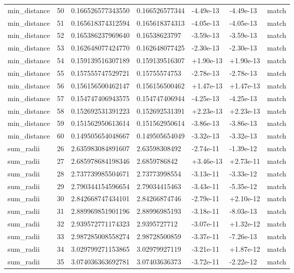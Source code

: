 \begin{longtable}{lllllll}
min\_distance & 50 & 0.166526577343550 & 0.166526577344 & -4.49e-13 & -4.49e-13 & match \\
min\_distance & 51 & 0.165618374312594 & 0.165618374313 & -4.05e-13 & -4.05e-13 & match \\
min\_distance & 52 & 0.165386237969640 & 0.16538623797 & -3.59e-13 & -3.59e-13 & match \\
min\_distance & 53 & 0.162648077424770 & 0.162648077425 & -2.30e-13 & -2.30e-13 & match \\
min\_distance & 54 & 0.159139516307189 & 0.159139516307 & +1.90e-13 & +1.90e-13 & match \\
min\_distance & 55 & 0.157555747529721 & 0.15755574753 & -2.78e-13 & -2.78e-13 & match \\
min\_distance & 56 & 0.156156500462147 & 0.156156500462 & +1.47e-13 & +1.47e-13 & match \\
min\_distance & 57 & 0.154747406943575 & 0.154747406944 & -4.25e-13 & -4.25e-13 & match \\
min\_distance & 58 & 0.152692531391223 & 0.152692531391 & +2.23e-13 & +2.23e-13 & match \\
min\_distance & 59 & 0.151562950613614 & 0.151562950614 & -3.86e-13 & -3.86e-13 & match \\
min\_distance & 60 & 0.149505654048667 & 0.149505654049 & -3.32e-13 & -3.32e-13 & match \\
sum\_radii & 26 & 2.635983084891607 & 2.63598308492 & -2.74e-11 & -1.39e-12 & match \\
sum\_radii & 27 & 2.685978684198346 & 2.6859786842 & +3.46e-13 & +2.73e-11 & match \\
sum\_radii & 28 & 2.737739985504671 & 2.73773998554 & -3.13e-11 & -3.33e-12 & match \\
sum\_radii & 29 & 2.790344154596654 & 2.79034415463 & -3.43e-11 & -5.35e-12 & match \\
sum\_radii & 30 & 2.842668747434101 & 2.84266874746 & -2.79e-11 & +2.10e-12 & match \\
sum\_radii & 31 & 2.889969851901196 & 2.88996985193 & -3.18e-11 & -8.03e-13 & match \\
sum\_radii & 32 & 2.939572771174323 & 2.9395727712 & -3.07e-11 & +1.32e-12 & match \\
sum\_radii & 33 & 2.987285008558274 & 2.98728500859 & -3.37e-11 & -7.26e-13 & match \\
sum\_radii & 34 & 3.029799271153865 & 3.02979927119 & -3.21e-11 & +1.87e-12 & match \\
sum\_radii & 35 & 3.074036363692781 & 3.07403636373 & -3.72e-11 & -2.22e-12 & match \\

\end{longtable}
